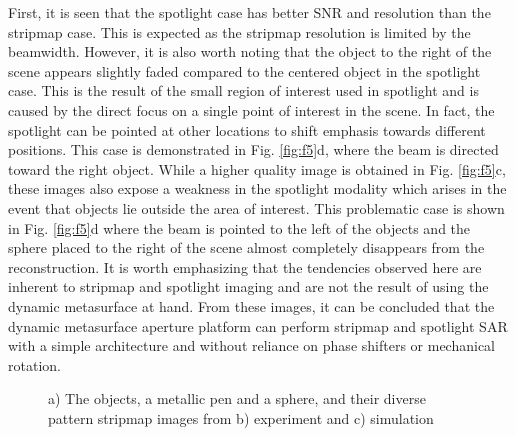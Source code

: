 \documentclass[journal]{IEEEtran}
\begin{document}
First, it is seen that the spotlight case has better SNR and resolution than the stripmap case. This is expected as the stripmap resolution is limited by the beamwidth. However, it is also worth noting that the object to the right of the scene appears slightly faded compared to the centered object in the spotlight case. This is the result of the small region of interest used in spotlight and is caused by the direct focus on a single point of interest in the scene. In fact, the spotlight can be pointed at other locations to shift emphasis towards different positions. This case is demonstrated in Fig. \ref{fig:f5}d, where the beam is directed toward the right object.  While a higher quality image is obtained in Fig. \ref{fig:f5}c, these images also expose a weakness in the spotlight modality which arises in the event that objects lie outside the area of interest. This problematic case is shown in Fig. \ref{fig:f5}d where the beam is pointed to the left of the objects and the sphere placed to the right of the scene almost completely disappears from the reconstruction. It is worth emphasizing that the tendencies observed here are inherent to stripmap and spotlight imaging and are not the result of using the dynamic metasurface at hand. From these images, it can be concluded that the dynamic metasurface aperture platform can perform stripmap and spotlight SAR with a simple architecture and without reliance on phase shifters or mechanical rotation.

\begin{figure}
	\centering
	\caption{\label{fig:f6}a) The objects, a metallic pen and a sphere, and their diverse pattern stripmap images from b) experiment and c) simulation}
\end{figure}
\end{document}

